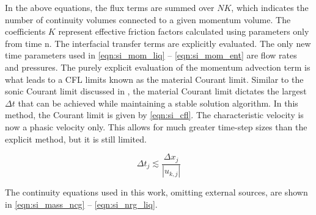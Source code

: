 In the above equations, the flux terms are summed over $NK$, which indicates the number of continuity volumes connected to a given momentum volume.
The coefficients $K$ represent effective friction factors calculated using parameters only from time n.
The interfacial transfer terms are explicitly evaluated.
The only new time parameters used in \eqref{eqn:si_mom_liq} -- \eqref{eqn:si_mom_ent} are flow rates and pressures.
The purely explicit evaluation of the momentum advection term is what leads to a CFL limits known as the material Courant limit.
Similar to the sonic Courant limit discussed in , the material Courant limit dictates the largest $\Delta t$ that can be achieved while maintaining a stable solution algorithm.
In this method, the Courant limit is given by \eqref{eqn:si_cfl}.
The characteristic velocity is now a phasic velocity only.
This allows for much greater time-step sizes than the explicit method, but it is still limited.

\begin{equation}
\label{eqn:si_cfl}
\Delta t_j \lesssim \frac{\Delta x_j}{|u_{k,j}|}
\end{equation}

The continuity equations used in this work, omitting external sources, are shown in \eqref{eqn:si_mass_ncg} -- \eqref{eqn:si_nrg_liq}.

